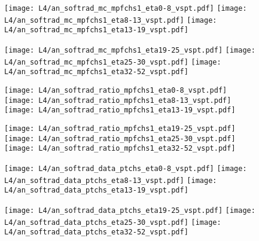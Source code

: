 \documentclass[landscape,10pt]{beamer} %
\begin{document}
{\newpage

\begin{figure}[p]
\centering
  \texttt{[image: L4/an\_softrad\_mc\_mpfchs1\_eta0-8\_vspt.pdf]}
  \texttt{[image: L4/an\_softrad\_mc\_mpfchs1\_eta8-13\_vspt.pdf]}
  \texttt{[image: L4/an\_softrad\_mc\_mpfchs1\_eta13-19\_vspt.pdf]}
\end{figure}
\begin{figure}[p]
\centering
  \texttt{[image: L4/an\_softrad\_mc\_mpfchs1\_eta19-25\_vspt.pdf]}
  \texttt{[image: L4/an\_softrad\_mc\_mpfchs1\_eta25-30\_vspt.pdf]}
  \texttt{[image: L4/an\_softrad\_mc\_mpfchs1\_eta32-52\_vspt.pdf]}
\end{figure}

\newpage

\begin{figure}[p]
\centering
  \texttt{[image: L4/an\_softrad\_ratio\_mpfchs1\_eta0-8\_vspt.pdf]}
  \texttt{[image: L4/an\_softrad\_ratio\_mpfchs1\_eta8-13\_vspt.pdf]}
  \texttt{[image: L4/an\_softrad\_ratio\_mpfchs1\_eta13-19\_vspt.pdf]}
\end{figure}
\begin{figure}[p]
\centering
  \texttt{[image: L4/an\_softrad\_ratio\_mpfchs1\_eta19-25\_vspt.pdf]}
  \texttt{[image: L4/an\_softrad\_ratio\_mpfchs1\_eta25-30\_vspt.pdf]}
  \texttt{[image: L4/an\_softrad\_ratio\_mpfchs1\_eta32-52\_vspt.pdf]}
\end{figure}

\newpage

\begin{figure}[p]
\centering
  \texttt{[image: L4/an\_softrad\_data\_ptchs\_eta0-8\_vspt.pdf]}
  \texttt{[image: L4/an\_softrad\_data\_ptchs\_eta8-13\_vspt.pdf]}
  \texttt{[image: L4/an\_softrad\_data\_ptchs\_eta13-19\_vspt.pdf]}
\end{figure}
\begin{figure}[p]
\centering
  \texttt{[image: L4/an\_softrad\_data\_ptchs\_eta19-25\_vspt.pdf]}
  \texttt{[image: L4/an\_softrad\_data\_ptchs\_eta25-30\_vspt.pdf]}
  \texttt{[image: L4/an\_softrad\_data\_ptchs\_eta32-52\_vspt.pdf]}
\end{figure}

}
\end{document}
